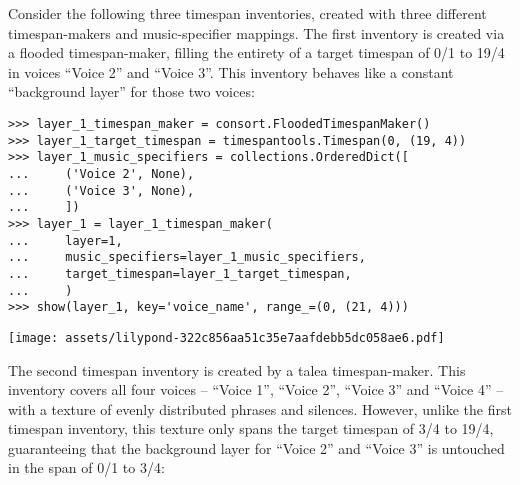 Consider the following three timespan inventories, created with three different
timespan-makers and music-specifier mappings. The first inventory is created
via a flooded timespan-maker, filling the entirety of a target timespan of 0/1
to 19/4 in voices \enquote{Voice 2} and \enquote{Voice 3}. This inventory
behaves like a constant \enquote{background layer} for those two voices:

\begin{comment}
<abjad>
layer_1_timespan_maker = consort.FloodedTimespanMaker()
layer_1_target_timespan = timespantools.Timespan(0, (19, 4))
layer_1_music_specifiers = collections.OrderedDict([
    ('Voice 2', None),
    ('Voice 3', None),
    ])
layer_1 = layer_1_timespan_maker(
    layer=1,
    music_specifiers=layer_1_music_specifiers,
    target_timespan=layer_1_target_timespan,
    )
show(layer_1, key='voice_name', range_=(0, (21, 4)))
</abjad>
\end{comment}

\begin{abjadbookoutput}
\begin{singlespacing}
\vspace{-0.5\baselineskip}
\begin{verbatim}
>>> layer_1_timespan_maker = consort.FloodedTimespanMaker()
>>> layer_1_target_timespan = timespantools.Timespan(0, (19, 4))
>>> layer_1_music_specifiers = collections.OrderedDict([
...     ('Voice 2', None),
...     ('Voice 3', None),
...     ])
>>> layer_1 = layer_1_timespan_maker(
...     layer=1,
...     music_specifiers=layer_1_music_specifiers,
...     target_timespan=layer_1_target_timespan,
...     )
>>> show(layer_1, key='voice_name', range_=(0, (21, 4)))
\end{verbatim}
\noindent\texttt{[image: assets/lilypond-322c856aa51c35e7aafdebb5dc058ae6.pdf]}
\end{singlespacing}
\end{abjadbookoutput}

\noindent The second timespan inventory is created by a talea timespan-maker.
This inventory covers all four voices -- \enquote{Voice 1}, \enquote{Voice 2},
\enquote{Voice 3} and \enquote{Voice 4} -- with a texture of evenly distributed
phrases and silences. However, unlike the first timespan inventory, this
texture only spans the target timespan of 3/4 to 19/4, guaranteeing that the
background layer for \enquote{Voice 2} and \enquote{Voice 3} is untouched in
the span of 0/1 to 3/4:

